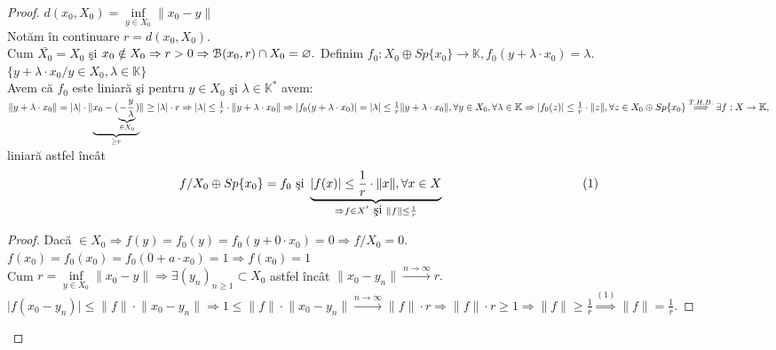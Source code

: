 \documentclass[ a4paper, 12pt]{report}
\theoremstyle{definition}
\theoremstyle{remark}
\numberwithin{equation}{section}
\begin{document}
\begin{proof}
$d(x_0,X_0) = \inf\limits_{y \in X_0} \lVert x_0 - y \rVert$\\
Not\u am \^in continuare $r = d(x_0,X_0).$\\
Cum $\bar{X_0} = X_0$ \c si $x_0 \notin X_0 \Rightarrow r>0\\
\Rightarrow \mathcal{B}(x_0,r) \cap X_0 = \varnothing.$
Definim $f_0 : X_0\oplus Sp\{x_0\} \rightarrow \mathbb{K}, f_0(y + \lambda \cdot x_0) = \lambda.$\\
$\{ y + \lambda \cdot x_0 / y \in X_0, \lambda \in \mathbb{K} \}$\\
Avem c\u a $f_0$ este liniar\u a \c si pentru $y \in X_0$ \c si $\lambda \in \mathbb{K}^{\ast}$ avem:\\
$\lVert  y + \lambda \cdot x_0 \rVert = \lvert \lambda \rvert \cdot \lVert \underbrace{ x_0 - (\underbrace{-\frac{y}{\lambda}}_{\in X_0})}_{\geq r} \rVert \geq \lvert \lambda \rvert \cdot r \Rightarrow \lvert \lambda \rvert \leq \frac{1}{r} \cdot \lVert y+\lambda \cdot x_0 \rVert \Rightarrow\\
 \lvert f_0(y + \lambda \cdot x_0) \rvert = \lvert \lambda \rvert \leq \frac{1}{r}\lVert y + \lambda \cdot x_0  \rVert, \forall y \in X_0, \forall \lambda \in \mathbb{K} \Rightarrow \lvert f_0(z) \rvert \leq \frac{1}{r} \cdot \lVert z \rVert, \forall z \in X_0 \oplus Sp\{x_0\} \stackrel{T.H.B.}{\Longrightarrow} \exists f : X \rightarrow \mathbb{K},$ liniar\u a astfel \^inc\^at\\ 
 \[f / X_0 \oplus Sp\{ x_0 \} = f_0\ \mbox{\c si}\ \underbrace{\lvert f(x) \rvert \leq \frac{1}{r} \cdot \lVert x \rVert, \forall x \in X}_{ \Rightarrow f \in X^{'}\ \mbox{\c si}\  \lVert f  \rVert \leq \frac{1}{r}}\hspace{40mm} (1)\] 
 \begin{proof}
 Dac\u a $ \in X_0 \Rightarrow f(y) = f_0(y) = f_0(y + 0 \cdot x_0) = 0 \Rightarrow f/X_0 = 0.$\\
 $f(x_0) = f_0(x_0) = f_0(0 + a \cdot x_0) = 1 \Rightarrow f(x_0) = 1$\\
 Cum $r = \inf\limits_{y \in X_0} \lVert x_0 - y  \rVert \Rightarrow \exists (y_n)_{n \geq 1} \subset X_0$ astfel \^inc\^at $\lVert x_0 - y_n \rVert \stackrel{n \rightarrow \infty}{\longrightarrow} r.$\\
 $\lvert f(x_0 - y_n)  \rvert \leq \lVert f  \rVert \cdot \lVert x_0 - y_n \rVert \Rightarrow 1 \leq \lVert f \rVert \cdot \lVert x_0 - y_n \rVert \stackrel{n \rightarrow \infty}{\longrightarrow} \lVert f  \rVert \cdot r \Rightarrow \lVert f \rVert \cdot r \geq 1 \Rightarrow \lVert f \rVert \geq \frac{1}{r} \stackrel{(1)}{\Rightarrow} \lVert f \rVert = \frac{1}{r}. $ 
 \end{proof}
\end{proof}
\end{document}

